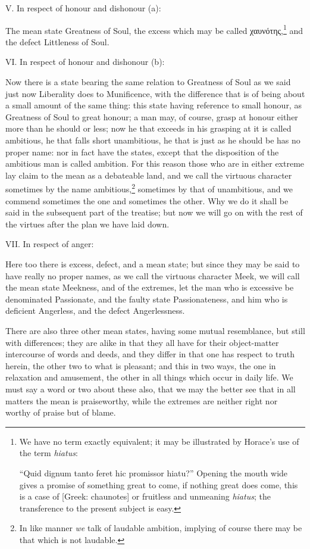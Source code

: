 V. In respect of honour and dishonour (a):

The mean state Greatness of Soul, the excess which may be called
χαυνότης,\footnote{We have no term exactly equivalent; it may be illustrated by Horace’s use
of the term \emph{hiatus}:

“Quid dignum tanto feret hic promissor hiatu?” Opening the mouth
wide gives a promise of something great to come, if nothing great does come,
this is a case of [Greek: chaunotes] or fruitless and unmeaning \emph{hiatus};
the transference to the present subject is easy.}
and the defect Littleness of Soul.

VI. In respect of honour and dishonour (b):

Now there is a state bearing the same relation to Greatness of Soul as we said
just now Liberality does to Munificence, with the difference that is of being
about a small amount of the same thing: this state having reference to small
honour, as Greatness of Soul to great honour; a man may, of course, grasp at
honour either more than he should or less; now he that exceeds in his grasping
at it is called ambitious, he that falls short unambitious, he that is just as
he should be has no proper name: nor in fact have the states, except that the
disposition of the ambitious man is called ambition. For this reason those who
are in either extreme lay claim to the mean as a debateable land, and we call
the virtuous character sometimes by the name ambitious,\footnote{In like manner \emph{we} talk of laudable ambition, implying of course there
may be that which is not laudable.}
sometimes by that of unambitious, and we commend sometimes the one and
sometimes the other. Why we do it shall be said in the subsequent part of the
treatise; but now we will go on with the rest of the virtues after the plan we
have laid down.

VII. In respect of anger:

Here too there is excess, defect, and a mean state; but since they may be said
to have really no proper names, as we call the virtuous character Meek, we will
call the mean state Meekness, and of the extremes, let the man who is excessive
be denominated Passionate, and the faulty state Passionateness, and him who is
deficient Angerless, and the defect Angerlessness.

There are also three other mean states, having some mutual resemblance, but
still with differences; they are alike in that they all have for their
object-matter intercourse of words and deeds, and they differ in that one has
respect to truth herein, the other two to what is pleasant; and this in two
ways, the one in relaxation and amusement, the other in all things which occur
in daily life. We must say a word or two about these also, that we may the
better see that in all matters the mean is praiseworthy, while the extremes are
neither right nor worthy of praise but of blame.


